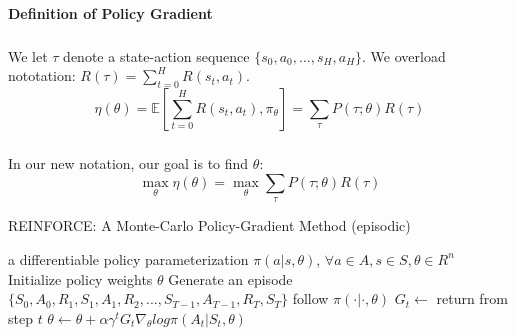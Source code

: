 \documentclass[12pt,a4paper]{article}
\begin{document}
\paragraph{Definition of Policy Gradient}
\subparagraph{}We let $\tau$ denote a state-action sequence $\{s_0, a_0, ..., s_H, a_H\}$. We overload nototation: $R(\tau) = \sum_{t=0}^{H} R(s_t, a_t)$.
\begin{equation}
\eta (\theta) = \mathbb{E}[\sum_{t=0}^{H}R(s_t, a_t), \pi_{\theta}] = \sum_{\tau}P(\tau; \theta)R(\tau)
\end{equation}
\subparagraph{}In our new notation, our goal is to find $\theta$:
\begin{equation}
\max_{\theta}\eta(\theta) = \max_{\theta}\sum_{\tau}P(\tau; \theta)R(\tau)
\end{equation}
 

\begin{algorithm}
	\caption{REINFORCE: A Monte-Carlo Policy-Gradient Method (episodic)}
	\begin{algorithmic}
		\Require a differentiable policy parameterization $\pi(a|s, \theta)$, $\forall a \in A, s \in S, \theta \in R^{n}$
		\State Initialize policy weights $\theta$
		\State Generate an episode $\{S_0, A_0, R_1, S_1, A_1, R_2, ..., S_{T-1}, A_{T-1}, R_T, S_T\}$ follow $\pi(\cdot | \cdot, \theta)$
			\State $G_t \leftarrow $ return from step $t$
			\State $\theta \leftarrow \theta + \alpha \gamma^{t} G_t \nabla_{\theta}log\pi(A_{t}|S_{t}, \theta)$
		\EndFor
		\EndWhile
	\end{algorithmic}
\end{algorithm}
\end{document}
